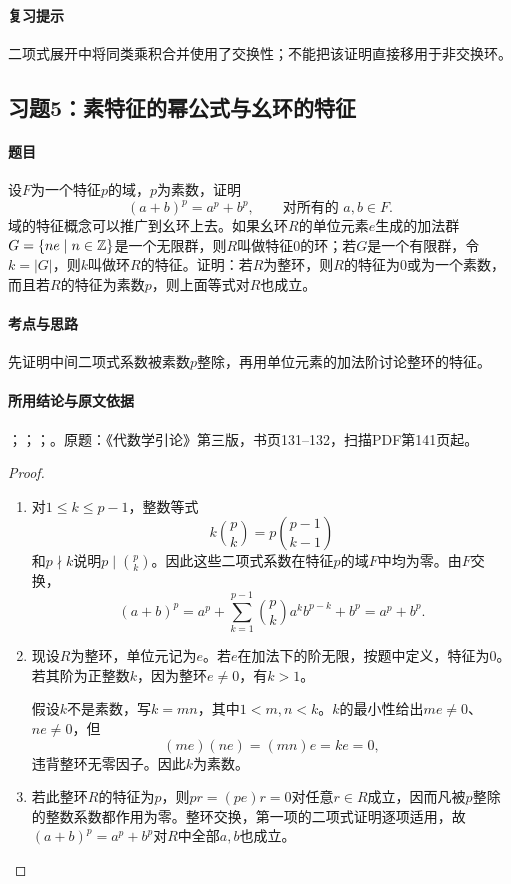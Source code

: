 \paragraph{复习提示}

二项式展开中将同类乘积合并使用了交换性；不能把该证明直接移用于非交换环。



\subsection{习题5：素特征的幂公式与幺环的特征}

\label{ex:3:5}

\paragraph{题目}

设$F$为一个特征$p$的域，$p$为素数，证明
\[
(a+b)^p=a^p+b^p,\qquad\text{对所有的 }a,b\in F.
\]
域的特征概念可以推广到幺环上去。如果幺环$R$的单位元素$e$生成的加法群$G=\{ne\mid n\in\mathbb Z\}$是一个无限群，则$R$叫做特征$0$的环；若$G$是一个有限群，令$k=|G|$，则$k$叫做环$R$的特征。证明：若$R$为整环，则$R$的特征为$0$或为一个素数，而且若$R$的特征为素数$p$，则上面等式对$R$也成立。

\paragraph{考点与思路}

先证明中间二项式系数被素数$p$整除，再用单位元素的加法阶讨论整环的特征。

\paragraph{所用结论与原文依据}

；；；。原题：《代数学引论》第三版，书页131--132，扫描PDF第141页起。


\begin{proof}

\begin{enumerate}
\item 对$1\le k\le p-1$，整数等式
\[
k\binom pk=p\binom{p-1}{k-1}
\]
和$p\nmid k$说明$p\mid\binom pk$。因此这些二项式系数在特征$p$的域$F$中均为零。由$F$交换，
\[
(a+b)^p=a^p+\sum_{k=1}^{p-1}\binom pk a^kb^{p-k}+b^p=a^p+b^p.
\]
\item 现设$R$为整环，单位元记为$e$。若$e$在加法下的阶无限，按题中定义，特征为$0$。若其阶为正整数$k$，因为整环$e\ne0$，有$k>1$。

假设$k$不是素数，写$k=mn$，其中$1<m,n<k$。$k$的最小性给出$me\ne0$、$ne\ne0$，但
\[
(me)(ne)=(mn)e=ke=0,
\]
违背整环无零因子。因此$k$为素数。
\item 若此整环$R$的特征为$p$，则$pr=(pe)r=0$对任意$r\in R$成立，因而凡被$p$整除的整数系数都作用为零。整环交换，第一项的二项式证明逐项适用，故$(a+b)^p=a^p+b^p$对$R$中全部$a,b$也成立。
\end{enumerate}

\end{proof}

